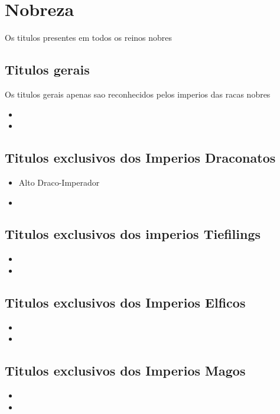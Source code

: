 \documentclass{book}
\begin{document}
\chapter{Nobreza}
Os titulos presentes em todos os reinos nobres
\section{Titulos gerais}
Os titulos gerais apenas sao reconhecidos pelos imperios das racas nobres
\begin{itemize}
    \item 
    \item
\end{itemize}
\section{Titulos exclusivos dos Imperios Draconatos}

\begin{itemize}
    \item Alto Draco-Imperador
    \item
\end{itemize}

\section{Titulos exclusivos dos imperios Tiefilings}
\begin{itemize}
    \item
    \item
\end{itemize}

\section{Titulos exclusivos dos Imperios Elficos}
\begin{itemize}
    \item
    \item
\end{itemize}

\section{Titulos exclusivos dos Imperios Magos}
\begin{itemize}
    \item
    \item
\end{itemize}
\end{document}
